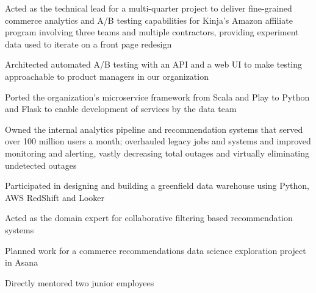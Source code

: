 \begin{job}

  \begin{accomplishments}
    \item Acted as the technical lead for a multi-quarter project to deliver
    fine-grained commerce analytics and A/B testing capabilities for Kinja's
    Amazon affiliate program involving three teams and multiple contractors,
    providing experiment data used to iterate on a front page redesign
    \item Architected automated A/B testing with an API and a web UI to make
    testing approachable to product managers in our organization
    \item Ported the organization's microservice framework from Scala and Play
    to Python and Flask to enable development of services by the data team
    \item Owned the internal analytics pipeline and recommendation systems that
    served over 100 million users a month; overhauled legacy jobs and systems
    and improved monitoring and alerting, vastly decreasing total outages and
    virtually eliminating undetected outages
  \end{accomplishments}
  \begin{extendedaccomplishments}
    \item Participated in designing and building a greenfield data warehouse
    using Python, AWS RedShift and Looker
    \item Acted as the domain expert for collaborative filtering based
    recommendation systems
    \item Planned work for a commerce recommendations data science exploration
    project in Asana
    \item Directly mentored two junior employees
  \end{extendedaccomplishments}
\end{job}
